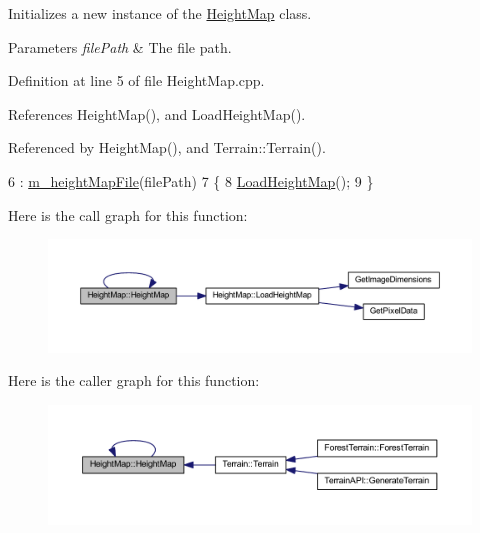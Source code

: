 Initializes a new instance of the \hyperlink{class_height_map}{Height\+Map} class. 


\begin{DoxyParams}{Parameters}
{\em file\+Path} & The file path.\\
\hline
\end{DoxyParams}


Definition at line 5 of file Height\+Map.\+cpp.



References Height\+Map(), and Load\+Height\+Map().



Referenced by Height\+Map(), and Terrain\+::\+Terrain().


\begin{DoxyCode}
6   : \hyperlink{class_height_map_ae9b9a9f4af0846321a8b03ff46dee730}{m\_heightMapFile}(filePath)
7 \{
8   \hyperlink{class_height_map_af4faa63fa0dfe8386342e45127d708d4}{LoadHeightMap}();
9 \}
\end{DoxyCode}


Here is the call graph for this function\+:
\nopagebreak
\begin{figure}[H]
\begin{center}
\leavevmode
\includegraphics[width=350pt]{class_height_map_a5a81f55f25aca424c9b9afddab239596_cgraph}
\end{center}
\end{figure}




Here is the caller graph for this function\+:
\nopagebreak
\begin{figure}[H]
\begin{center}
\leavevmode
\includegraphics[width=350pt]{class_height_map_a5a81f55f25aca424c9b9afddab239596_icgraph}
\end{center}
\end{figure}





